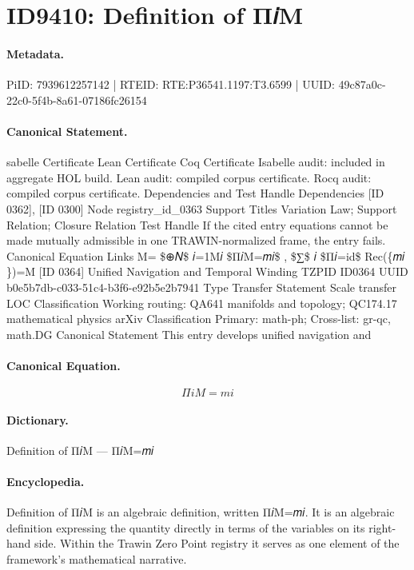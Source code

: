 \section*{ID9410: Definition of Π𝑖M}
\paragraph{Metadata.}
PiID: 7939612257142 | RTEID: RTE:P36541.1197:T3.6599 | UUID: 49c87a0c-22c0-5f4b-8a61-07186fc26154

\paragraph{Canonical Statement.}
sabelle Certificate Lean Certificate Coq Certificate Isabelle audit: included in aggregate HOL build. Lean audit: compiled corpus certificate. Rocq audit: compiled corpus certificate. Dependencies and Test Handle Dependencies [ID 0362], [ID 0300] Node registry\_id\_0363 Support Titles Variation Law; Support Relation; Closure Relation Test Handle If the cited entry equations cannot be made mutually admissible in one TRAWIN-normalized frame, the entry fails. Canonical Equation Links M= \$⊕𝑁\$ 𝑖=1M𝑖 \$Π𝑖M=𝑚𝑖\$ , \$∑\$ 𝑖 \$Π𝑖=id\$ Rec(\{𝑚𝑖 \})=M [ID 0364] Unified Navigation and Temporal Winding TZPID ID0364 UUID b0e5b7db-c033-51c4-b3f6-e92b5e2b7941 Type Transfer Statement Scale transfer LOC Classification Working routing: QA641 manifolds and topology; QC174.17 mathematical physics arXiv Classification Primary: math-ph; Cross-list: gr-qc, math.DG Canonical Statement This entry develops unified navigation and

\paragraph{Canonical Equation.}
\[
Π𝑖M=𝑚𝑖
\]

\paragraph{Dictionary.}
Definition of Π𝑖M — Π𝑖M=𝑚𝑖

\paragraph{Encyclopedia.}
Definition of Π𝑖M is an algebraic definition, written Π𝑖M=𝑚𝑖. It is an algebraic definition expressing the quantity directly in terms of the variables on its right-hand side. Within the Trawin Zero Point registry it serves as one element of the framework's mathematical narrative.
